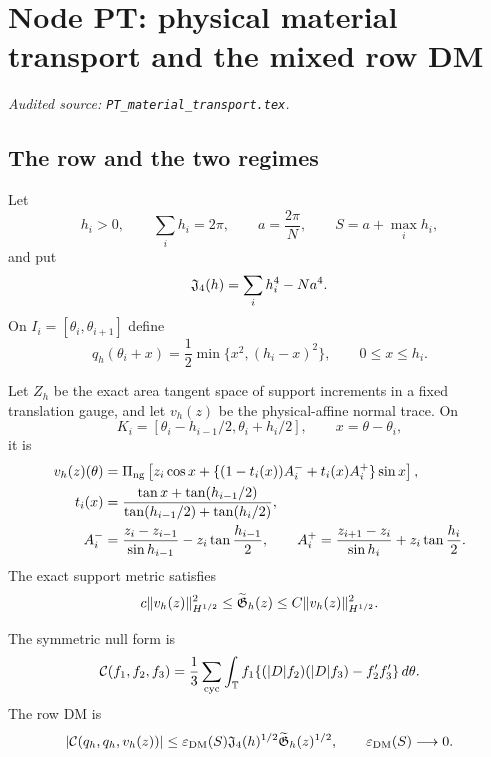 \begingroup
\section{Node PT: physical material transport and the mixed row DM}
\label{module:PT}
\noindent\textit{Audited source: \nolinkurl{PT_material_transport.tex}.}
\subsection{The row and the two regimes}

Let
\begin{equation}\label{PT:eq:fan}
 h_i>0,\qquad \sum_i h_i=2\pi,\qquad
 a=\frac{2\pi}{N},\qquad S=a+\max_i h_i,
\end{equation}
and put
\begin{equation}\label{PT:eq:J}
 \mathfrak J_4(h)=\sum_i h_i^4-Na^4.
\end{equation}
On $I_i=[\theta_i,\theta_{i+1}]$ define
\begin{equation}\label{PT:eq:q}
 q_h(\theta_i+x)=\frac12\min\{x^2,(h_i-x)^2\},
 \qquad0\le x\le h_i.
\end{equation}

Let $Z_h$ be the exact area tangent space of support increments in a fixed
translation gauge, and let $v_h(z)$ be the physical-affine normal trace.
On
\[
 K_i=[\theta_i-h_{i-1}/2,\theta_i+h_i/2],\qquad x=\theta-\theta_i,
\]
it is
\begin{align}
 v_h(z)(\theta)
 &=\Pi_{\rm ng}\left[z_i\cos x+
 \{(1-t_i(x))A_i^-+t_i(x)A_i^+\}\sin x\right],
 \label{PT:eq:trace}\\
 t_i(x)&=\frac{\tan x+\tan(h_{i-1}/2)}
 {\tan(h_{i-1}/2)+\tan(h_i/2)},\notag\\
 A_i^-&=\frac{z_i-z_{i-1}}{\sin h_{i-1}}
       -z_i\tan\frac{h_{i-1}}2,\qquad
 A_i^+=\frac{z_{i+1}-z_i}{\sin h_i}
       +z_i\tan\frac{h_i}2.\notag
\end{align}
The exact support metric satisfies
\begin{equation}\label{PT:eq:metric}
 c\|v_h(z)\|_{H^{1/2}}^2
 \le\widetilde{\mathfrak G}_h(z)\le C\|v_h(z)\|_{H^{1/2}}^2.
\end{equation}

The symmetric null form is
\begin{equation}\label{PT:eq:null}
 \mathcal C(f_1,f_2,f_3)
 =\frac13\sum_{\rm cyc}\int_\mathbb T f_1
 \{(|D|f_2)(|D|f_3)-f_2'f_3'\}\,d\theta.
\end{equation}
The row DM is
\begin{equation}\label{PT:eq:DM-target}
 |\mathcal C(q_h,q_h,v_h(z))|
 \le\varepsilon_{\rm DM}(S)\mathfrak J_4(h)^{1/2}
       \widetilde{\mathfrak G}_h(z)^{1/2},
 \qquad\varepsilon_{\rm DM}(S)\longrightarrow0.
\end{equation}

